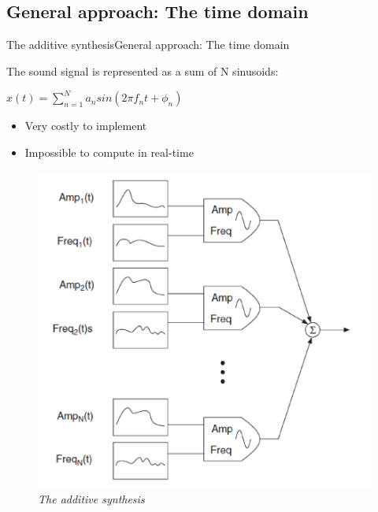\documentclass[10pt]{beamer}
\begin{document}
\subsection{General approach: The time domain}
\begin{frame}{The additive synthesis}{General approach: The time domain}
\begin{block}{}
The sound signal is represented as a sum of N sinusoids: \\
\centerline{
$ x(t) = \sum\limits_{n=1}^N a_{n} sin(2 \pi f_{n} t + \phi_{n})$}
\begin{itemize}
\item Very costly to implement
\item Impossible to compute in real-time
\end{itemize}
\end{block}
\begin{figure}
	\centerline
	{\includegraphics[scale=0.25]{additif.png}}
	\caption{\it The additive synthesis}
\end{figure}
\end{frame}

\end{document}
